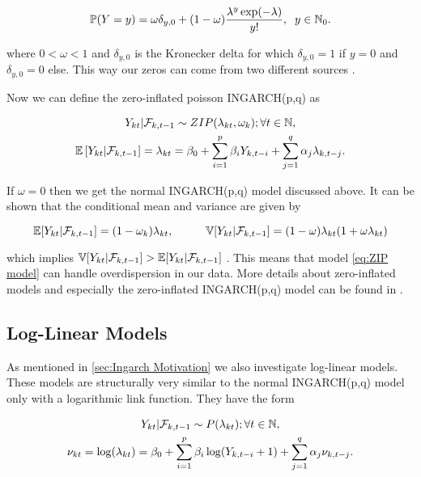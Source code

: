 \begin{equation}
\mathbb{P}(Y=y) = \omega \delta_{y,0}+ (1-\omega) \frac{\lambda^y \exp(-\lambda)}{y!}, \hspace{0.2cm} y \in \mathbb{N}_0.
\label{eq:ZIP Distribution}
\end{equation}

where $0 < \omega < 1$ and $\delta_{y,0}$ is the Kronecker delta for which $\delta_{y,0}=1$ if $y=0$ and $\delta_{y,0}=0$ else. This way our zeros can come from two different sources \cite{Zhu:2012}. 

Now we can define the zero-inflated poisson INGARCH(p,q) as

\begin{gather}
\label{eq:ZIP model}
Y_{kt} | \mathcal{F}_{k,t-1} \sim ZIP(\lambda_{kt},\omega_k); \forall t \in \mathbb{N}, \\
\mathbb{E}\left[Y_{kt} | \mathcal{F}_{k,t-1} \right] = \lambda_{kt} = \beta_0 + \sum_{i=1}^p\beta_i Y_{k,t-i} + \sum_{j=1}^q\alpha_j \lambda_{k,t-j}.
\end{gather}

If $\omega =0$ then we get the normal INGARCH(p,q) model discussed above. It can be shown that the conditional mean and variance are given by

\begin{equation*}
\mathbb{E}[Y_{kt} | \mathcal{F}_{k,t-1}] = (1-\omega_k)\lambda_{kt}, \hspace{1cm} \mathbb{V}[Y_{kt} | \mathcal{F}_{k,t-1}] =(1-\omega)\lambda_{kt}(1+\omega \lambda_{kt})
\label{eq:Conditional Mean and Variance ZIP}
\end{equation*}

which implies $ \mathbb{V}[Y_{kt} | \mathcal{F}_{k,t-1}] > \mathbb{E}[Y_{kt} | \mathcal{F}_{k,t-1}]$ \cite{Zhu:2012}. This means that model \ref{eq:ZIP model} can handle overdispersion in our data. More details about zero-inflated models and especially the zero-inflated INGARCH(p,q) model can be found in \cite{Zhu:2012}.


\subsection{Log-Linear Models}
\label{sec: Log-Linear Models}

As mentioned in \ref{sec:Ingarch Motivation} we also investigate log-linear models. These models are structurally very similar to the normal INGARCH(p,q) model only with a logarithmic link function. They have the form 

\begin{gather}
Y_{kt} | \mathcal{F}_{k,t-1} \sim P(\lambda_{kt}); \forall t \in \mathbb{N}, \\
\nu_{kt}= \log(\lambda_{kt}) = \beta_0 + \sum_{i=1}^p\beta_i \log(Y_{k,t-i}+1) + \sum_{j=1}^q\alpha_j \nu_{k,t-j}.
\label{eq:Log-Linear model}
\end{gather}

